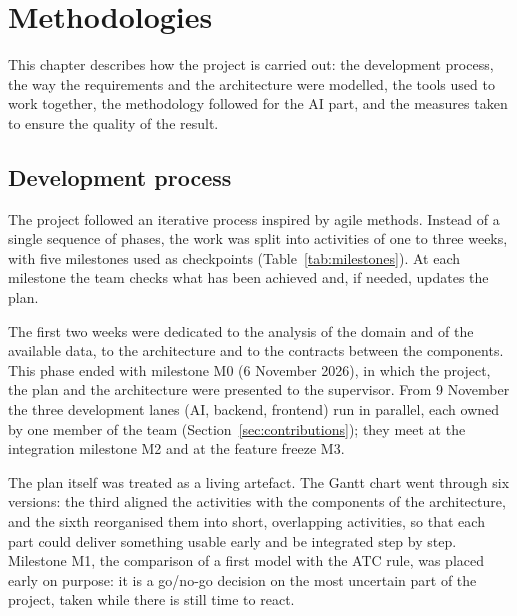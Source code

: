 \chapter{Methodologies}
\label{chap:methodologies}

This chapter describes how the project is carried out: the development process, the way the
requirements and the architecture were modelled, the tools used to work together, the
methodology followed for the AI part, and the measures taken to ensure the quality of the
result.


\section{Development process}
\label{sec:process}

The project followed an iterative process inspired by agile methods. Instead of a single
sequence of phases, the work was split into activities of one to three weeks, with five
milestones used as checkpoints (Table~\ref{tab:milestones}). At each milestone the team checks
what has been achieved and, if needed, updates the plan.

The first two weeks were dedicated to the analysis of the domain and of the available data, to
the architecture and to the contracts between the components. This phase ended with milestone M0
(6 November 2026), in which the project, the plan and the architecture were presented to the
supervisor. From 9 November the three development lanes (AI, backend, frontend) run in parallel,
each owned by one member of the team (Section~\ref{sec:contributions}); they meet at the
integration milestone M2 and at the feature freeze M3.

The plan itself was treated as a living artefact. The Gantt chart went through six versions:
the third aligned the activities with the components of the architecture, and the sixth
reorganised them into short, overlapping activities, so that each part could deliver something
usable early and be integrated step by step. Milestone M1, the comparison of a first model with
the ATC rule, was placed early on purpose: it is a go/no-go decision on the most uncertain part
of the project, taken while there is still time to react.

